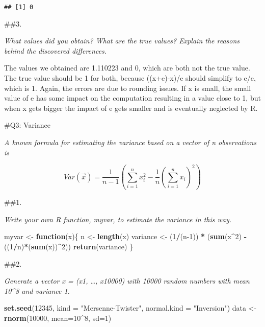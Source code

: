 \documentclass[]{article}
\newenvironment{Shaded}{\begin{snugshade}}{\end{snugshade}}
\newcommand{\ControlFlowTok}[1]{\textcolor[rgb]{0.13,0.29,0.53}{\textbf{#1}}}
\newcommand{\DataTypeTok}[1]{\textcolor[rgb]{0.13,0.29,0.53}{#1}}
\newcommand{\DecValTok}[1]{\textcolor[rgb]{0.00,0.00,0.81}{#1}}
\newcommand{\KeywordTok}[1]{\textcolor[rgb]{0.13,0.29,0.53}{\textbf{#1}}}
\newcommand{\NormalTok}[1]{#1}
\newcommand{\OperatorTok}[1]{\textcolor[rgb]{0.81,0.36,0.00}{\textbf{#1}}}
\newcommand{\StringTok}[1]{\textcolor[rgb]{0.31,0.60,0.02}{#1}}
\begin{document}
\begin{verbatim}
## [1] 0
\end{verbatim}

\#\#3.

\emph{What values did you obtain? What are the true values? Explain the
reasons behind the discovered differences.}

The values we obtained are 1.110223 and 0, which are both not the true
value. The true value should be 1 for both, because ((x+e)-x)/e should
simplify to e/e, which is 1. Again, the errors are due to rounding
issues. If x is small, the small value of e has some impact on the
computation resulting in a value close to 1, but when x gets bigger the
impact of e gets smaller and is eventually neglected by R.

\newpage

\#Q3: Variance

\emph{A known formula for estimating the variance based on a vector of n
observations is}

\[Var(\overrightarrow{x}) = \frac{1}{n - 1}(\sum_{i=1}^{n}x_i^2-\frac{1}{n}(\sum_{i=1}^{n}x_i)^2)\]

\#\#1.

\emph{Write your own R function, myvar, to estimate the variance in this
way.}

\begin{Shaded}
\begin{Highlighting}[]
\NormalTok{myvar <-}\StringTok{ }\ControlFlowTok{function}\NormalTok{(x)\{}
\NormalTok{  n <-}\StringTok{ }\KeywordTok{length}\NormalTok{(x)}
\NormalTok{  variance <-}\StringTok{ }\NormalTok{(}\DecValTok{1}\OperatorTok{/}\NormalTok{(n}\DecValTok{-1}\NormalTok{)) }\OperatorTok{*}\StringTok{ }\NormalTok{(}\KeywordTok{sum}\NormalTok{(x}\OperatorTok{^}\DecValTok{2}\NormalTok{) }\OperatorTok{-}\StringTok{ }\NormalTok{((}\DecValTok{1}\OperatorTok{/}\NormalTok{n)}\OperatorTok{*}\NormalTok{(}\KeywordTok{sum}\NormalTok{(x))}\OperatorTok{^}\DecValTok{2}\NormalTok{))}
  \KeywordTok{return}\NormalTok{(variance)}
\NormalTok{\}}
\end{Highlighting}
\end{Shaded}

\#\#2.

\emph{Generate a vector x = (x1, \ldots{}, x10000) with 10000 random
numbers with mean 10\^{}8 and variance 1.}

\begin{Shaded}
\begin{Highlighting}[]
\KeywordTok{set.seed}\NormalTok{(}\DecValTok{12345}\NormalTok{, }\DataTypeTok{kind =} \StringTok{"Mersenne-Twister"}\NormalTok{, }\DataTypeTok{normal.kind =} \StringTok{"Inversion"}\NormalTok{)}
\NormalTok{data <-}\StringTok{ }\KeywordTok{rnorm}\NormalTok{(}\DecValTok{10000}\NormalTok{, }\DataTypeTok{mean=}\DecValTok{10}\OperatorTok{^}\DecValTok{8}\NormalTok{, }\DataTypeTok{sd=}\DecValTok{1}\NormalTok{)}
\end{Highlighting}
\end{Shaded}
\end{document}

